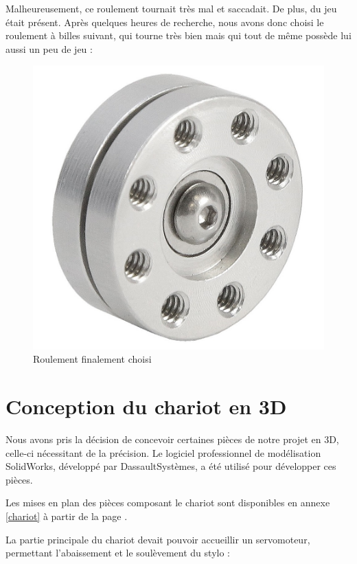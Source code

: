 \documentclass[12pt,a4paper]{report}
\begin{document}
Malheureusement, ce roulement tournait très mal et saccadait. De plus, du jeu était présent. Après quelques heures de recherche, nous avons donc choisi le roulement à billes suivant, qui tourne très bien mais qui tout de même possède lui aussi un peu de jeu :

	\begin{figure}[!h]
 \center
 \includegraphics[scale=0.15]{../pictures/swivelhub}
 \caption{Roulement finalement choisi}
\end{figure}

	
	
	\section{Conception du chariot en 3D}
	Nous avons pris la décision de concevoir certaines pièces de notre projet en 3D, celle-ci nécessitant de la précision. Le logiciel professionnel de modélisation SolidWorks, développé par DassaultSystèmes, a été utilisé pour développer ces pièces.
	
	Les mises en plan des pièces composant le chariot sont disponibles en annexe \ref{chariot} à partir de la page \pageref{chariot}.
	
	La partie principale du chariot devait pouvoir accueillir un servomoteur, permettant l'abaissement et le soulèvement du stylo :
	
\end{document}
